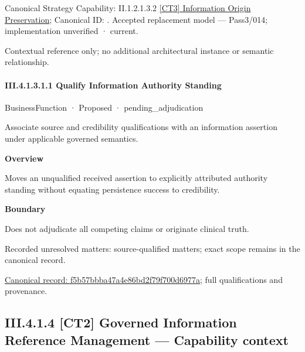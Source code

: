 {\small Canonical Strategy Capability: II.1.2.1.3.2 \hyperref[element:f8380437093b41a0a8fdd1f198d7bf42]{[CT3] Information Origin Preservation}; Canonical ID: \texttt{}. Accepted replacement model — Pass3/014; implementation unverified · current.}\par
Contextual reference only; no additional architectural instance or semantic relationship.\par
\paragraph*{III.4.1.3.1.1 Qualify Information Authority Standing}
\label{navigation:III.4.1.3.1.1}

\label{element:f5b57bbba47a4e86bd2f79f700d6977a}
{\small BusinessFunction · Proposed · pending\_adjudication}\par

Associate source and credibility qualifications with an information assertion under applicable governed semantics.



\textbf{Overview}



Moves an unqualified received assertion to explicitly attributed authority standing without equating persistence success to credibility.



\textbf{Boundary}



Does not adjudicate all competing claims or originate clinical truth.


{\small Recorded unresolved matters: source-qualified matters; exact scope remains in the canonical record.}\par
{\footnotesize \href{../../../../../../../../continuum/business/business-function/f5b57bbba47a4e86bd2f79f700d6977a.md}{Canonical record: f5b57bbba47a4e86bd2f79f700d6977a}; full qualifications and provenance.}\par
\subsection*{III.4.1.4 [CT2] Governed Information Reference Management — Capability context}
\label{navigation:III.4.1.4}

